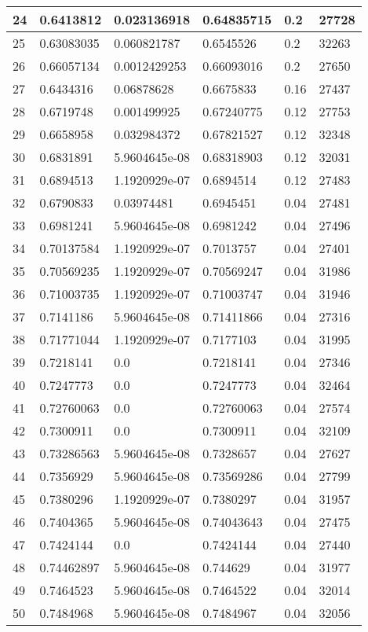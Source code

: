 \begin{longtable}{|l|l|l|l|l|l|}
24 & 0.6413812 & 0.023136918 & 0.64835715 & 0.2 & 27728 \\ \hline 
25 & 0.63083035 & 0.060821787 & 0.6545526 & 0.2 & 32263 \\ \hline 
26 & 0.66057134 & 0.0012429253 & 0.66093016 & 0.2 & 27650 \\ \hline 
27 & 0.6434316 & 0.06878628 & 0.6675833 & 0.16 & 27437 \\ \hline 
28 & 0.6719748 & 0.001499925 & 0.67240775 & 0.12 & 27753 \\ \hline 
29 & 0.6658958 & 0.032984372 & 0.67821527 & 0.12 & 32348 \\ \hline 
30 & 0.6831891 & 5.9604645e-08 & 0.68318903 & 0.12 & 32031 \\ \hline 
31 & 0.6894513 & 1.1920929e-07 & 0.6894514 & 0.12 & 27483 \\ \hline 
32 & 0.6790833 & 0.03974481 & 0.6945451 & 0.04 & 27481 \\ \hline 
33 & 0.6981241 & 5.9604645e-08 & 0.6981242 & 0.04 & 27496 \\ \hline 
34 & 0.70137584 & 1.1920929e-07 & 0.7013757 & 0.04 & 27401 \\ \hline 
35 & 0.70569235 & 1.1920929e-07 & 0.70569247 & 0.04 & 31986 \\ \hline 
36 & 0.71003735 & 1.1920929e-07 & 0.71003747 & 0.04 & 31946 \\ \hline 
37 & 0.7141186 & 5.9604645e-08 & 0.71411866 & 0.04 & 27316 \\ \hline 
38 & 0.71771044 & 1.1920929e-07 & 0.7177103 & 0.04 & 31995 \\ \hline 
39 & 0.7218141 & 0.0 & 0.7218141 & 0.04 & 27346 \\ \hline 
40 & 0.7247773 & 0.0 & 0.7247773 & 0.04 & 32464 \\ \hline 
41 & 0.72760063 & 0.0 & 0.72760063 & 0.04 & 27574 \\ \hline 
42 & 0.7300911 & 0.0 & 0.7300911 & 0.04 & 32109 \\ \hline 
43 & 0.73286563 & 5.9604645e-08 & 0.7328657 & 0.04 & 27627 \\ \hline 
44 & 0.7356929 & 5.9604645e-08 & 0.73569286 & 0.04 & 27799 \\ \hline 
45 & 0.7380296 & 1.1920929e-07 & 0.7380297 & 0.04 & 31957 \\ \hline 
46 & 0.7404365 & 5.9604645e-08 & 0.74043643 & 0.04 & 27475 \\ \hline 
47 & 0.7424144 & 0.0 & 0.7424144 & 0.04 & 27440 \\ \hline 
48 & 0.74462897 & 5.9604645e-08 & 0.744629 & 0.04 & 31977 \\ \hline 
49 & 0.7464523 & 5.9604645e-08 & 0.7464522 & 0.04 & 32014 \\ \hline 
50 & 0.7484968 & 5.9604645e-08 & 0.7484967 & 0.04 & 32056 \\ \hline 
\end{longtable}